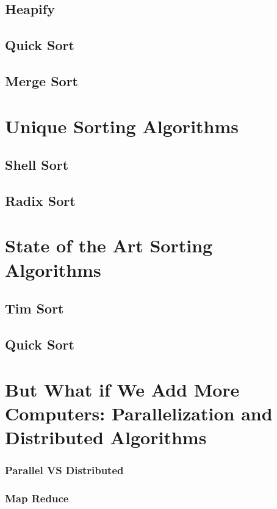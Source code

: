\documentclass[10pt,a4paper]{book}
\begin{document}
\subsection{Heapify}

\subsection{Quick Sort}
\subsection{Merge Sort}



\section{Unique Sorting Algorithms}


\subsection{Shell Sort}

\subsection{Radix Sort}

\section{State of the Art Sorting Algorithms}

\subsection{Tim Sort}
\subsection{Quick Sort}
\section{But What if We Add More Computers: Parallelization and Distributed Algorithms}



\subsubsection{Parallel VS Distributed}

\subsubsection{Map Reduce }
\end{document}
